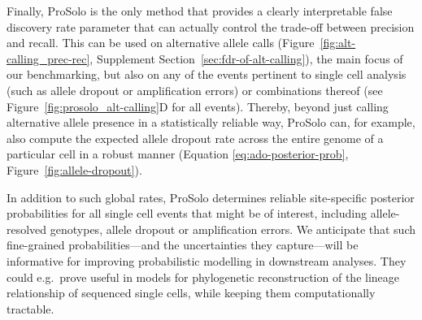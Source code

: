 \documentclass[fleqn,12pt,inline]{wlscirep}
\begin{document}
Finally, ProSolo is the only method that provides a clearly interpretable false discovery rate parameter that can actually control the trade-off between precision and recall.
This can be used on alternative allele calls (Figure~\ref{fig:alt-calling_prec-rec}, Supplement Section~\ref{sec:fdr-of-alt-calling}), the main focus of our benchmarking, but also on any of the events pertinent to single cell analysis (such as allele dropout or amplification errors) or combinations thereof (see Figure~\ref{fig:prosolo_alt-calling}D for all events).
Thereby, beyond just calling alternative allele presence in a statistically reliable way, ProSolo can, for example, also compute the expected allele dropout rate across the entire genome of a particular cell in a robust manner (Equation \ref{eq:ado-posterior-prob}, Figure~\ref{fig:allele-dropout}).

In addition to such global rates, ProSolo determines reliable site-specific posterior probabilities for all single cell events that might be of interest, including allele-resolved genotypes, allele dropout or amplification errors. 
We anticipate that such fine-grained probabilities---and the uncertainties they capture---will be informative for improving probabilistic modelling in downstream analyses.
They could e.g.~prove useful in models for phylogenetic reconstruction of the lineage relationship of sequenced single cells\cite{singer_single-cell_2018,zafar_siclonefit:_2018,koptagel_scuphr:_2018}, while keeping them computationally tractable\cite{lahnemann_eleven_2020}.
\end{document}
